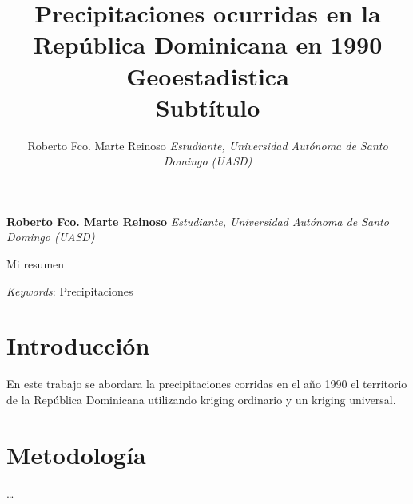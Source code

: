 \documentclass[11pt,]{article}
\title{Precipitaciones ocurridas en la República Dominicana en 1990\\
Geoestadistica\\
Subtítulo  }
\author{\Large Roberto Fco. Marte Reinoso\vspace{0.05in} \newline\normalsize\emph{Estudiante, Universidad Autónoma de Santo Domingo (UASD)}  }
\date{}
\newcommand*{\authorfont}{\fontfamily{phv}\selectfont}
\renewenvironment{abstract}
 {{%
    \setlength{\leftmargin}{0mm}
    \setlength{\rightmargin}{\leftmargin}%
  }%
  \relax}
 {\endlist}
\begin{document}
	
%

{%
\setlength{\parindent}{0pt}
\thispagestyle{plain}
{\fontsize{18}{20}\selectfont\raggedright 
\maketitle  %

}

{
   \vskip 13.5pt\relax \normalsize\fontsize{11}{12} 
\textbf{\authorfont Roberto Fco. Marte Reinoso} \hskip 15pt \emph{\small Estudiante, Universidad Autónoma de Santo Domingo (UASD)}   

}

}








\begin{abstract}

    \hbox{\vrule height .2pt width 39.14pc}

    \vskip 8.5pt %

\noindent Mi resumen


\vskip 8.5pt \noindent \emph{Keywords}: Precipitaciones \par

    \hbox{\vrule height .2pt width 39.14pc}



\end{abstract}


\vskip 6.5pt


\noindent  \section{Introducción}\label{introducciuxf3n}

En este trabajo se abordara la precipitaciones corridas en el año 1990
el territorio de la República Dominicana utilizando kriging ordinario y
un kriging universal.

\section{Metodología}\label{metodologuxeda}

\ldots
\end{document}
